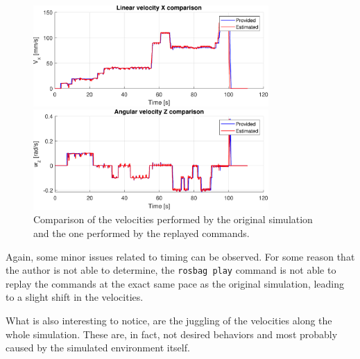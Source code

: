 \begin{figure}[H]
    \centering
    \includegraphics[width=0.8\textwidth]{./img/MATLAB/linear_velocity_comparison.pdf}

    \vspace{10pt}

    \includegraphics[width=0.8\textwidth]{./img/MATLAB/angular_velocity_comparison.pdf}
    \caption{Comparison of the velocities performed by the original simulation and the one performed by the replayed commands.}
    \label{fig:velocity_comparison}
\end{figure}

Again, some minor issues related to timing can be observed.
For some reason that the author is not able to determine, the \texttt{rosbag play} command is not able to replay the commands at the exact same pace as the original simulation, leading to a slight shift in the velocities.

What is also interesting to notice, are the juggling of the velocities along the whole simulation.
These are, in fact, not desired behaviors and most probably caused by the simulated environment itself.